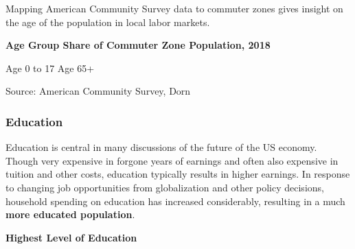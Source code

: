 \documentclass{report}
\newcommand{\tbllink}[1]{\href{https://raw.githubusercontent.com/bdecon/US-chartbook/master/chartbook/data/#1}{\faTable}}
\begin{document}
{{{\vspace{2mm}


\begin{minipage}{0.76\textwidth}
\small Mapping American Community Survey data to commuter zones gives insight on the age of the population in local labor markets.  \\



\end{minipage}
\vspace{3mm}

\noindent \normalsize \textbf{Age Group Share of Commuter Zone Population, 2018}

\hspace{2mm} Age 0 to 17 \hspace{62mm} Age 65+

\vspace{-3mm}
\hspace{-9mm}  \hspace{-3mm} 

\vspace{-3mm}
\footnotesize{Source: American Community Survey, Dorn} \hspace{61mm} \tbllink{acs_cz_age.csv}




\newpage


\begin{minipage}{0.76\textwidth}

\subsubsection*{\color{black!70} \seriffont Education}

\small Education is central in many discussions of the future of the US economy. Though very expensive in forgone years of earnings and often also expensive in tuition and other costs, education typically results in higher earnings. In response to changing job opportunities from globalization and other policy decisions, household spending on education has increased considerably, resulting in a much \textbf{more educated population}.
\end{minipage}

\vspace{2mm}

\begin{minipage}{0.33\textwidth}
\small  
\end{minipage}\hspace{6mm}
\begin{minipage}{0.39\textwidth}
\normalsize \textbf{Highest Level of Education}


\end{minipage}}}}
\end{document}
